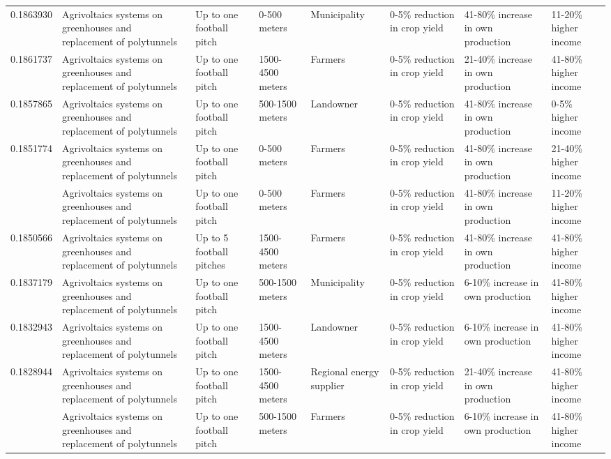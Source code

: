 \begin{table}
\begin{tabular}[t]{rlllllll}
0.1863930 & Agrivoltaics systems on greenhouses
and replacement of polytunnels & Up to one football pitch & 0-500 meters & Municipality & 0-5\% reduction in crop yield & 41-80\% increase in own production & 11-20\% higher income\\
0.1861737 & Agrivoltaics systems on greenhouses
and replacement of polytunnels & Up to one football pitch & 1500-4500 meters & Farmers & 0-5\% reduction in crop yield & 21-40\% increase in own production & 41-80\% higher income\\
0.1857865 & Agrivoltaics systems on greenhouses
and replacement of polytunnels & Up to one football pitch & 500-1500 meters & Landowner & 0-5\% reduction in crop yield & 41-80\% increase in own production & 0-5\% higher income\\
0.1851774 & Agrivoltaics systems on greenhouses
and replacement of polytunnels & Up to one football pitch & 0-500 meters & Farmers & 0-5\% reduction in crop yield & 41-80\% increase in own production & 21-40\% higher income\\
\addlinespace
0.1851774 & Agrivoltaics systems on greenhouses
and replacement of polytunnels & Up to one football pitch & 0-500 meters & Farmers & 0-5\% reduction in crop yield & 41-80\% increase in own production & 11-20\% higher income\\
0.1850566 & Agrivoltaics systems on greenhouses
and replacement of polytunnels & Up to 5 football pitches & 1500-4500 meters & Farmers & 0-5\% reduction in crop yield & 41-80\% increase in own production & 41-80\% higher income\\
0.1837179 & Agrivoltaics systems on greenhouses
and replacement of polytunnels & Up to one football pitch & 500-1500 meters & Municipality & 0-5\% reduction in crop yield & 6-10\% increase in own production & 41-80\% higher income\\
0.1832943 & Agrivoltaics systems on greenhouses
and replacement of polytunnels & Up to one football pitch & 1500-4500 meters & Landowner & 0-5\% reduction in crop yield & 6-10\% increase in own production & 41-80\% higher income\\
0.1828944 & Agrivoltaics systems on greenhouses
and replacement of polytunnels & Up to one football pitch & 1500-4500 meters & Regional energy supplier & 0-5\% reduction in crop yield & 21-40\% increase in own production & 41-80\% higher income\\
\addlinespace
0.1825024 & Agrivoltaics systems on greenhouses
and replacement of polytunnels & Up to one football pitch & 500-1500 meters & Farmers & 0-5\% reduction in crop yield & 6-10\% increase in own production & 41-80\% higher income\\

\end{tabular}
\end{table}
